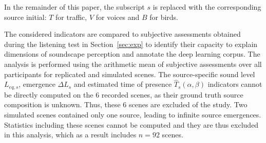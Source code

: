 \documentclass[twocolumn]{article}
\begin{document}
In the remainder of this paper, the subscript $s$ is replaced with the corresponding source initial: $T$ for traffic, $V$ for voices and $B$ for birds.

The considered indicators are compared to subjective assessments obtained during the listening test in Section~\ref{sec:exp} to identify their capacity to explain dimensions of soundscape perception and annotate the deep learning corpus. The analysis is performed using the arithmetic mean of subjective assessments over all participants for replicated and simulated scenes. The source-specific sound level $L_{eq, s}$, emergence $\Delta L_{s}$ and estimated time of presence $\hat T_s(\alpha, \beta)$ indicators cannot be directly computed on the 6 recorded scenes, as their ground truth source composition is unknown. Thus, these 6 scenes are excluded of the study. Two simulated scenes contained only one source, leading to infinite source emergences. Statistics including these scenes cannot be computed and they are thus excluded in this analysis, which as a result includes $n=92$ scenes.
\end{document}
